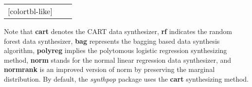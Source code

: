 \begin{table}[h]
\begin{NiceTabular}{@{}lll@{}}[colortbl-like]
        
    \end{NiceTabular}
    {\parbox{6in}{
    \footnotesize Note that \textbf{cart} denotes the CART data synthesizer, \textbf{rf} indicates the random forest data synthesizer, \textbf{bag} represents the bagging based data synthesis algorithm, \textbf{polyreg} implies the polytomous logistic regression synthesizing method, \textbf{norm} stands for the normal linear regression data synthesizer, and \textbf{normrank} is an improved version of  norm by preserving the marginal distribution. By default, the \textit{synthpop} package uses the \textbf{cart} synthesizing method.}
    }

    \label{tab:syn}

\end{table}

